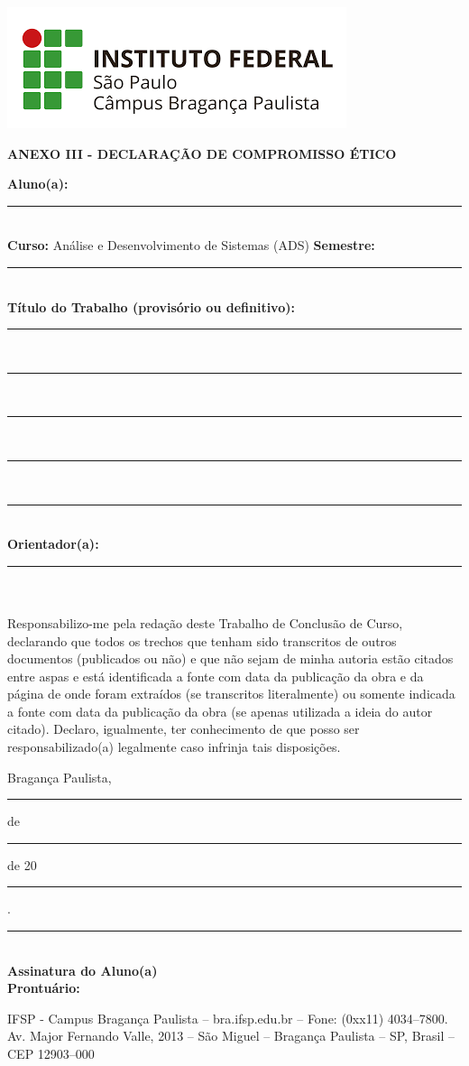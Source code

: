 \documentclass[12pt,a4paper]{report}
\newcommand{\cabecalho}{ANEXO III - DECLARAÇÃO DE COMPROMISSO ÉTICO}
\begin{document}
	\includegraphics[scale=0.35]{IFSP-BRA.png}	\hline
\vspace{1.2cm}
	\begin{center}
		{\large\textbf{\cabecalho}}\\
	\end{center}
	
	\noindent \textbf{Aluno(a): } \rule{15cm}{0.1pt} \\
	\noindent \textbf{Curso: } Análise e Desenvolvimento de Sistemas (ADS)\hspace{0.03cm} \textbf{Semestre:}  \rule{2cm}{0.1pt} \\
	\noindent \textbf{Título do Trabalho (provisório ou definitivo): } \rule{7.7cm}{0.1pt} \\
	\rule{17cm}{0.1pt} \\
	\rule{17cm}{0.1pt} \\
	\rule{17cm}{0.1pt} \\
	\rule{17cm}{0.1pt} \\
	\noindent \textbf{Orientador(a): } \rule{14cm}{0.1pt} \\
    \\
    \noindent \large{Responsabilizo-me pela redação deste Trabalho de Conclusão de Curso, declarando que todos os trechos que tenham sido transcritos de outros documentos (publicados ou não) e que não sejam de minha autoria estão citados entre aspas e está identificada a fonte com data da publicação da obra e da página de onde foram extraídos (se transcritos literalmente) ou somente indicada a fonte com data da publicação da obra (se apenas utilizada a ideia do autor citado). Declaro, igualmente, ter conhecimento de que posso ser responsabilizado(a) legalmente caso infrinja tais disposições.}\\
    
    \begin{center}
        {Bragança Paulista, \rule{1cm}{0.1pt} de \rule{5cm}{0.1pt} de 20\rule{1cm}{0.1pt}.}
	\end{center}
	\vspace{2cm}
	\begin{table}[ht]
		\centering \rule{10cm}{0.1pt}               
		\\ \small{\textbf{Assinatura do Aluno(a)}}
		\\ \small{\textbf{Prontuário: }} 
	\end{table}

	\hline 
	\vspace{0.2cm}
	\centering \tiny{IFSP - Campus Bragança Paulista – bra.ifsp.edu.br – Fone: (0xx11) 4034–7800.
Av. Major Fernando Valle, 2013 – São Miguel – Bragança Paulista – SP, Brasil – CEP 12903–000}
\end{document}
